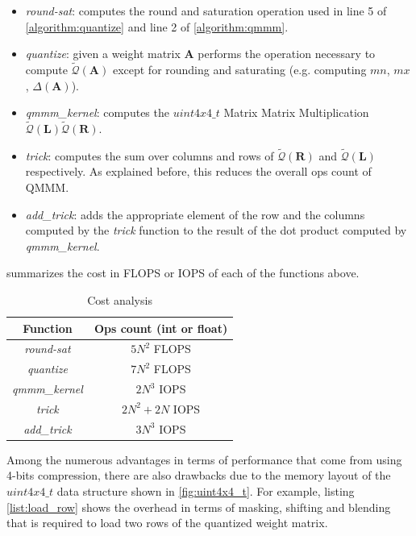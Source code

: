 \begin{itemize}
\item \emph{round-sat}: computes the round and saturation operation used in line 5 of \cref{algorithm:quantize} and line 2 of \cref{algorithm:qmmm}.
\item \emph{quantize}: given a weight matrix $\mathbf{A}$ performs the operation necessary to compute  $\tilde{\mathcal{Q}}(\mathbf{A}) $ except for rounding and saturating (e.g. computing $mn$, $mx$, $\Delta(\mathbf{A})$).
\item \emph{qmmm\_kernel}: computes the  $uint4x4\_t$ Matrix Matrix Multiplication $ \tilde{\mathcal{Q}}(\mathbf{L}) \tilde{\mathcal{Q}}(\mathbf{R})$.
\item \emph{trick}: computes the sum over columns and rows of $\tilde{\mathcal{Q}}(\mathbf{R})$ and $\tilde{\mathcal{Q}}(\mathbf{L})$ respectively. As explained before, this reduces the overall ops count of QMMM. 
\item \emph{add\_trick}: adds the appropriate element of the row and the columns computed by the \emph{trick} function to the result of the dot product computed by \emph{qmmm\_kernel}.
\end{itemize}
 summarizes the cost in FLOPS or IOPS of each of the functions above.

\begin{table}
\centering
\begin{tabular}{ c|c } 
 
 Function & Ops count (int or float) \\
 \hline 
 \emph{round-sat} & $5N^2$ FLOPS \\
\emph{quantize} & $7N^2$ FLOPS \\
\emph{qmmm\_kernel} & $2N^3$ IOPS \\
\emph{trick} & $2N^2 + 2N$ IOPS \\
\emph{add\_trick} & $3N^3$ IOPS \\
 \end{tabular}
  \caption{Cost analysis}
\label{tab:cost} 
\end{table}

Among the numerous advantages in terms of performance that come from using 4-bits compression, there are also drawbacks due to the memory layout of the $uint4x4\_t$ data structure shown in \cref{fig:uint4x4_t}. For example, listing \ref{list:load_row} shows the overhead in terms of masking, shifting and blending that is required to load two rows of the quantized weight matrix.

